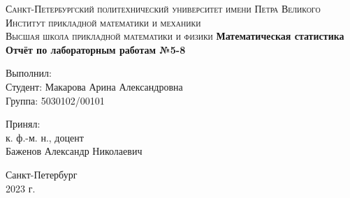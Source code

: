 \documentclass[a4paper]{article}
\begin{document}
\begin{titlepage}
		\begin{center}
			\textsc{
				Санкт-Петербургский политехнический университет имени Петра Великого \\[5mm]
				Институт прикладной математики и механики\\[2mm]
				Высшая школа прикладной математики и физики            
			}   
			\vfill
			\textbf{\large
				Математическая статистика\\
				Отчёт по лабораторным работам №5-8 \\[3mm]
			}                
		\end{center}
		
		\vfill
		\hfill
		\begin{minipage}{0.5\textwidth}
			Выполнил: \\[2mm]   
			Студент: Макарова Арина Александровна \\
			Группа: 5030102/00101\\
		\end{minipage}
		
		\hfill
		\begin{minipage}{0.5\textwidth}
			Принял: \\[2mm]
			к. ф.-м. н., доцент \\   
			Баженов Александр Николаевич
		\end{minipage}
		
		\vfill
		\begin{center}
			Санкт-Петербург \\2023 г.
		\end{center}
	\end{titlepage}
\newpage
\newpage
\begin{center}
    \setcounter{page}{2}
    \tableofcontents
\end{center}
\newpage
\begin{center}
    \setcounter{page}{3}
    \listoffigures
\end{center}
\newpage
\end{document}
